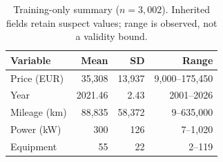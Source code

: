 \begin{table}[h!]
\centering\small\setlength{\tabcolsep}{3pt}
\begin{tabular}{lrrr}
\toprule
Variable & Mean & SD & Range\\
\midrule
Price (EUR) & 35,308 & 13,937 & 9,000--175,450\\
Year & 2021.46 & 2.43 & 2001--2026\\
Mileage (km) & 88,835 & 58,372 & 9--635,000\\
Power (kW) & 300 & 126 & 7--1,020\\
Equipment & 55 & 22 & 2--119\\
\bottomrule
\end{tabular}
\caption{Training-only summary ($n=3,002$). Inherited fields retain suspect values; range is observed, not a validity bound.}
\label{tab:data}
\end{table}
